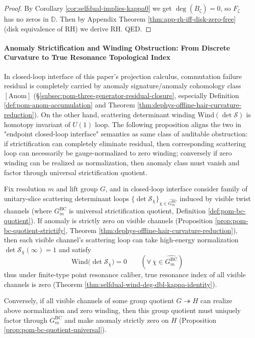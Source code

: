 \begin{proof}
By Corollary \ref{cor:selfdual-implies-kappa0} we get \(\deg(B_{\zeta})=0\), so \(F_{\zeta}\) has no zeros in \(\mathbb{D}\).
Then by Appendix Theorem \ref{thm:app-rh-iff-disk-zero-free} (disk equivalence of RH) we derive RH. QED.
\end{proof}

\paragraph{Anomaly Strictification and Winding Obstruction: From Discrete Curvature to True Resonance Topological Index}
In closed-loop interface of this paper's projection calculus, commutation failure residual is completely carried by anomaly signature/anomaly cohomology class \([\mathrm{Anom}]\) (\S\ref{subsec:pom-three-generator-residual-closure}, especially Definition \ref{def:pom-anom-accumulation} and Theorem \ref{thm:dephys-offline-hair-curvature-reduction}).
On the other hand, scattering determinant winding \(\mathrm{Wind}(\det\mathcal S)\) is homotopy invariant of \(U(1)\) loop.
The following proposition aligns the two in "endpoint closed-loop interface" semantics as same class of auditable obstruction: if strictification can completely eliminate residual, then corresponding scattering loop can necessarily be gauge-normalized to zero winding; conversely if zero winding can be realized as normalization, then anomaly class must vanish and factor through universal strictification quotient.

\begin{theorem}\label{thm:xi-anom-winding-obstruction}
Fix resolution \(m\) and lift group \(G\), and in closed-loop interface consider family of unitary-slice scattering determinant loops \(\{\det\mathcal S_{\overline\chi}\}_{\overline\chi\in\widehat{G^{\mathrm{BC}}_m}}\) induced by visible twist channels (where \(G^{\mathrm{BC}}_m\) is universal strictification quotient, Definition \ref{def:pom-bc-quotient}).
If anomaly is strictly zero on visible channels (Proposition \ref{prop:pom-bc-quotient-strictify}, Theorem \ref{thm:dephys-offline-hair-curvature-reduction}), then each visible channel's scattering loop can take high-energy normalization \(\det\mathcal S_{\overline\chi}(\infty)=1\) and satisfy
\[
\boxed{\;
\mathrm{Wind}\bigl(\det\mathcal S_{\overline\chi}\bigr)=0\qquad(\forall\,\overline\chi\in\widehat{G^{\mathrm{BC}}_m})\;}
\]
thus under finite-type point resonance caliber, true resonance index of all visible channels is zero (Theorem \ref{thm:selfdual-wind-deg-dbl-kappa-identity}).
\par
Conversely, if all visible channels of some group quotient \(G\twoheadrightarrow H\) can realize above normalization and zero winding, then this group quotient must uniquely factor through \(G^{\mathrm{BC}}_m\) and make anomaly strictly zero on \(H\) (Proposition \ref{prop:pom-bc-quotient-universal}).
\end{theorem}


